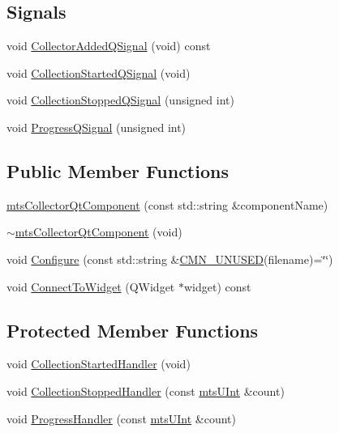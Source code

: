 \subsection*{Signals}
\begin{DoxyCompactItemize}
\item 
void \hyperlink{classmts_collector_qt_component_adf2c95bbca70332594de2e61affdd2f6}{Collector\-Added\-Q\-Signal} (void) const 
\item 
void \hyperlink{classmts_collector_qt_component_adb2bcd73754b187d969c06b3f961a425}{Collection\-Started\-Q\-Signal} (void)
\item 
void \hyperlink{classmts_collector_qt_component_a3a1bb21c889148a474b43b871082c511}{Collection\-Stopped\-Q\-Signal} (unsigned int)
\item 
void \hyperlink{classmts_collector_qt_component_aa256f60afac2f43bdf991d5ef179bf16}{Progress\-Q\-Signal} (unsigned int)
\end{DoxyCompactItemize}
\subsection*{Public Member Functions}
\begin{DoxyCompactItemize}
\item 
\hyperlink{classmts_collector_qt_component_ae4f9827203aad5d2ddefb21733cf1884}{mts\-Collector\-Qt\-Component} (const std\-::string \&component\-Name)
\item 
\hyperlink{classmts_collector_qt_component_a712616b1d64f8fcde6b9ca6796a1fb7e}{$\sim$mts\-Collector\-Qt\-Component} (void)
\item 
void \hyperlink{classmts_collector_qt_component_ae26b8dd5c49c06493a2a6b316f447bfb}{Configure} (const std\-::string \&\hyperlink{cmn_portability_8h_a021894e2626935fa2305434b1e893ff6}{C\-M\-N\-\_\-\-U\-N\-U\-S\-E\-D}(filename)=\char`\"{}\char`\"{})
\item 
void \hyperlink{classmts_collector_qt_component_a243287888fb742cc81fd53bb8eb30b62}{Connect\-To\-Widget} (Q\-Widget $\ast$widget) const 
\end{DoxyCompactItemize}
\subsection*{Protected Member Functions}
\begin{DoxyCompactItemize}
\item 
void \hyperlink{classmts_collector_qt_component_a28959a6307475a97abd5c74017bc2e11}{Collection\-Started\-Handler} (void)
\item 
void \hyperlink{classmts_collector_qt_component_a6fc1efb58a3f87f4cdb0ee7869796bd1}{Collection\-Stopped\-Handler} (const \hyperlink{mts_generic_object_proxy_8h_aa17aa0caae80dcf94844f2bd9942adba}{mts\-U\-Int} \&count)
\item 
void \hyperlink{classmts_collector_qt_component_aab79eab8ea9ba41ffae55e59d2772890}{Progress\-Handler} (const \hyperlink{mts_generic_object_proxy_8h_aa17aa0caae80dcf94844f2bd9942adba}{mts\-U\-Int} \&count)
\end{DoxyCompactItemize}
